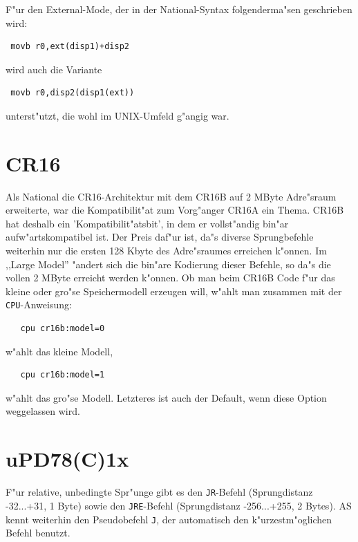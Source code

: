 \documentclass[12pt,a4paper,twoside]{report}
\newcommand{\tty}[1]{{\tt #1}}
\newcommand{\asname}{AS}
\begin{document}
F"ur den External-Mode, der in der National-Syntax folgenderma"sen geschrieben
wird:
\begin{verbatim}
 movb r0,ext(disp1)+disp2
\end{verbatim}
wird auch die Variante
\begin{verbatim}
 movb r0,disp2(disp1(ext))
\end{verbatim}
unterst"utzt, die wohl im UNIX-Umfeld g"angig war.


\section{CR16}
\label{CR16Spec}

Als National die CR16-Architektur mit dem CR16B auf 2 MByte Adre"sraum
erweiterte, war die Kompatibilit"at zum Vorg"anger CR16A ein Thema.  CR16B
hat deshalb ein 'Kompatibilit"atsbit', in dem er vollst"andig bin"ar
aufw"artskompatibel ist.  Der Preis daf"ur ist, da"s diverse Sprungbefehle
weiterhin nur die ersten 128 Kbyte des Adre"sraumes erreichen k"onnen.  Im
,,Large Model'' "andert sich die bin"are Kodierung dieser Befehle, so da"s
die vollen 2 MByte erreicht werden k"onnen.  Ob man beim CR16B Code f"ur
das kleine oder gro"se Speichermodell erzeugen will, w"ahlt man zusammen
mit der \tty{CPU}-Anweisung:

\begin{verbatim}
   cpu cr16b:model=0
\end{verbatim}

w"ahlt das kleine Modell,

\begin{verbatim}
   cpu cr16b:model=1
\end{verbatim}

w"ahlt das gro"se Modell.  Letzteres ist auch der Default, wenn diese Option
weggelassen wird.


\section{uPD78(C)1x}
\label{78C1xSpec}

F"ur relative, unbedingte Spr"unge gibt es den \tty{JR}-Befehl (Sprungdistanz
-32...+31, 1 Byte) sowie den \tty{JRE}-Befehl (Sprungdistanz -256...+255, 2
Bytes).  \asname{} kennt weiterhin den Pseudobefehl \tty{J}, der automatisch den
k"urzestm"oglichen Befehl benutzt.
\end{document}
